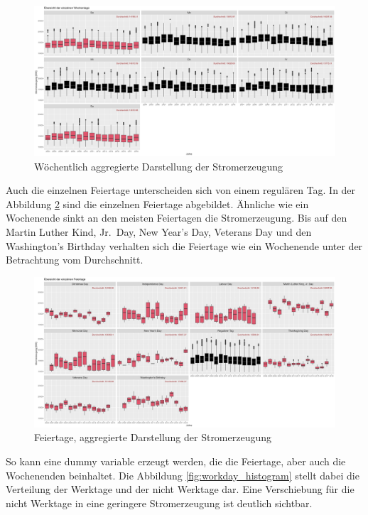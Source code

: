 \documentclass[11pt,ngerman,a4paper,]{article}
\begin{document}
\begin{figure}[H]
\centering
\includegraphics[width=1.0\textwidth]{plots/weekday_boxplot.png}
\caption{Wöchentlich aggregierte Darstellung der Stromerzeugung}
\label{fig:weekday_boxplot}
\end{figure}

Auch die einzelnen Feiertage unterscheiden sich von einem regulären Tag. In der Abbildung \ref{fig:holiday_boxplot} sind die einzelnen Feiertage abgebildet. Ähnliche wie ein Wochenende sinkt an den meisten Feiertagen die Stromerzeugung. Bis auf den Martin Luther Kind, Jr.~Day, New Year's Day, Veterans Day und den Washington's Birthday verhalten sich die Feiertage wie ein Wochenende unter der Betrachtung vom Durchschnitt.

\begin{figure}[H]
\centering
\includegraphics[width=1.0\textwidth]{plots/holiday_boxplot}
\caption{Feiertage, aggregierte Darstellung der Stromerzeugung}
\label{fig:holiday_boxplot}
\end{figure}

So kann eine dummy variable erzeugt werden, die die Feiertage, aber auch die Wochenenden beinhaltet. Die Abbildung \ref{fig:workday_histogram} stellt dabei die Verteilung der Werktage und der nicht Werktage dar. Eine Verschiebung für die nicht Werktage in eine geringere Stromerzeugung ist deutlich sichtbar.
\end{document}
